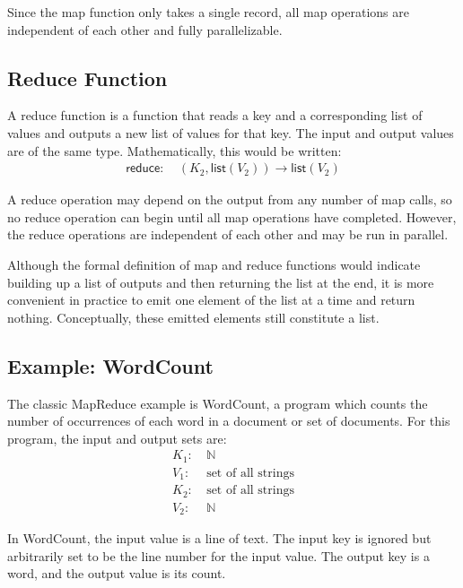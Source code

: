 \documentclass[letterpaper]{sig-alternate}
\providecommand{\List}[1]{\ensuremath{\mathsf{list}(#1)}}
\providecommand{\Pair}[2]{\ensuremath{(#1, #2)}}
\providecommand{\NaturalSet}{\ensuremath{\mathbb{N}}}
\providecommand{\InputKeySet}{\ensuremath{K_1}}
\providecommand{\OutputKeySet}{\ensuremath{K_2}}
\providecommand{\InputValSet}{\ensuremath{V_1}}
\providecommand{\OutputValSet}{\ensuremath{V_2}}
\begin{document}
Since the map function only takes a single record, all map operations are
independent of each other and fully parallelizable.

\subsection{Reduce Function}

A reduce function is a function that reads a key and a corresponding list of
values and outputs a new list of values for that key.  The input and output
values are of the same type.  Mathematically, this would be written:
\begin{align}
\mathsf{reduce}:\:&\Pair{\OutputKeySet}{\List{\OutputValSet}} \rightarrow
\List{\OutputValSet}
\end{align}

A reduce operation may depend on the output from any number of map calls, so
no reduce operation can begin until all map operations have completed.
However, the reduce operations are independent of each other and may be run in
parallel.

Although the formal definition of map and reduce functions would indicate
building up a list of outputs and then returning the list at the end, it is
more convenient in practice to emit one element of the list at a time and
return nothing.  Conceptually, these emitted elements still constitute a list.

\subsection{Example: WordCount}

The classic MapReduce example is WordCount, a program which counts the number
of occurrences of each word in a document or set of documents.  For this
program, the input and output sets are:
\begin{align}
\InputKeySet:\: &\NaturalSet
\label{eq:wc-inputkey}
\\
\InputValSet:\: & \text{set of all strings}
\label{eq:wc-inputval}
\\
\OutputKeySet:\: &\text{set of all strings}
\label{eq:wc-outputkey}
\\
\OutputValSet:\: &\NaturalSet
\label{eq:wc-outputval}
\end{align}

In WordCount, the input value is a line of text.  The input key is ignored but
arbitrarily set to be the line number for the input value.  The output key is
a word, and the output value is its count.
\end{document}
